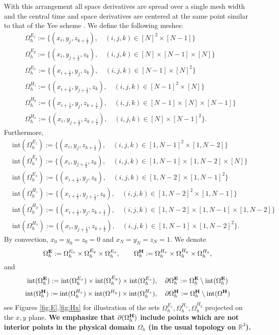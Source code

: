 \documentclass[12pt,reqno]{amsart}
\newcommand{\R}{\mathbb{R}}
\newcommand{\e}{{\bf E}}
\newcommand{\h}{{\bf H}}
\theoremstyle{definition}
\numberwithin{equation}{section}
\def\Gw{\Omega}     \def\Gx{\Xi}         \def\Gy{\Psi}
\def\Gwh{\Omega_h}
\begin{document}
	
	With this arrangement all space derivatives are spread over a single mesh width and the central time and space derivatives
	are centered at the same point similar to that of the Yee scheme \cite{yee}. 
	We define the following meshes:
	\begin{align}\label{eq:meshes}
		&\Gwh^{E_z}:=\{(x_i,y_j,z_{k+\frac{1}{2}}),\quad (i,j,k)\in [N]^2 \times[N-1]\} \\\nonumber
		& \Gwh^{E_y}:=\{(x_i,y_{j+\frac{1}{2}},z_{k}), \quad (i,j,k)\in [N]\times [N-1] \times[N] \}\\\nonumber
		& \Gwh^{E_x}:=\{ (x_{i+\frac{1}{2}},y_{j},z_{k}),\quad (i,j,k) \in [N-1]\times [N]^2 \} \\ \nonumber
		&\Gwh^{H_z}:=\{ (x_{i+\frac{1}{2}},y_{j+\frac{1}{2}},z_{k}),\quad (i,j,k)\in [N-1]^2\times[N] \}\\ \nonumber
		&\Gwh^{H_y}:=\{ (x_{i+\frac{1}{2}},y_j,z_{k+\frac{1}{2}}),\quad (i,j,k) \in [N-1]\times [N] \times [N-1] \}\\ \nonumber
		& \Gwh^{H_x}:=\{ (x_i,y_{j+\frac{1}{2}},z_{k+\frac{1}{2}}), \quad (i,j,k) \in [N]\times [N-1]^2\}.\nonumber
	\end{align}
Furthermore,
	\begin{align}\label{eq:interior_meshes}
	&\mathrm{int}(\Gwh^{E_z}):=\{(x_i,y_j,z_{k+\frac{1}{2}}),\quad (i,j,k)\in [1,N-1]^2 \times[1,N-2]\} \\ \nonumber
	&\mathrm{int}( \Gwh^{E_y}):=\{(x_i,y_{j+\frac{1}{2}},z_{k}), \quad (i,j,k)\in [1,N-1]\times [1,N-2] \times[N] \}\\  \nonumber
	& \mathrm{int}(\Gwh^{E_x}):=\{ (x_{i+\frac{1}{2}},y_{j},z_{k}),\quad (i,j,k) \in [1,N-2]\times [1,N-1]^2 \} \\  \nonumber
	&\mathrm{int}(\Gwh^{H_z}):=\{ (x_{i+\frac{1}{2}},y_{j+\frac{1}{2}},z_{k}),\quad (i,j,k)\in [1,N-2]^2\times[1,N-1] \}\\ \nonumber
	&\mathrm{int}(\Gwh^{H_y}):=\{ (x_{i+\frac{1}{2}},y_j,z_{k+\frac{1}{2}}),\quad (i,j,k) \in [1,N-2]\times [1,N-1] \times [1,N-2] \}\\ \nonumber
	& \mathrm{int}(\Gwh^{H_x}):=\{ (x_i,y_{j+\frac{1}{2}},z_{k+\frac{1}{2}}), \quad (i,j,k) \in [1,N-1]\times [1,N-2]^2\}. \nonumber
\end{align}
By convection, $x_0=y_0=z_0=0$ and $x_N=y_N=z_N=1$.
	We denote 
$$
\Gwh^{{\bf E}}:=\Gwh^{E_x}\times \Gwh^{E_y}\times \Gwh^{E_z}, \qquad 
\Gwh^{\bf H}:=
\Gwh^{H_x}\times \Gwh^{H_y}\times \Gwh^{H_z},
$$
and 
$$
\mathrm{int}(\Gwh^{{\e}}):=\mathrm{int}(\Gwh^{E_x})\times \mathrm{int}(\Gwh^{E_y})\times \mathrm{int}(\Gwh^{E_z}),
\quad \partial \Gwh^\e:=\Gwh^\e\setminus  \mathrm{int}(\Gwh^{\e})
$$
$$
\mathrm{int}(\Gwh^{\h}):=
\mathrm{int}(\Gwh^{H_x})\times \mathrm{int}(\Gw^{H_y})\times \mathrm{int}(\Gwh^{H_z}),
\quad \partial \Gwh^\h:=\Gwh^\h\setminus  \mathrm{int}(\Gw^{\h})
$$
see Figures \ref{fig:E},\ref{fig:Hx} for illustration of the sets 
$\Gwh^{E_z}, \Gwh^{H_x},\Gwh^{H_y}$ projected on the $x,y$ plane.
{\bf We emphasize that $\partial(\Gwh^\h)$ include points which are not interior points
	 in the physical domain $\Gwh$	 (in the usual topology on $\R^3$). }
\end{document}
